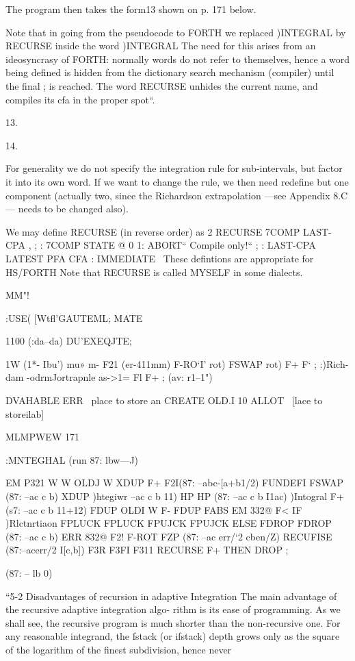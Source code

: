 {The program then takes the form13 shown on p. 171 below.

Note that in going from the pseudocode to FORTH we replaced
)INTEGRAL by RECURSE inside the word )INTEGRAL The
need for this arises from an ideosyncrasy of FORTH: normally
words do not refer to themselves, hence a word being deﬁned is
hidden from the dictionary search mechanism (compiler) until
the ﬁnal ; is reached. The word RECURSE unhides the current
name, and compiles its cfa in the proper spot“.

 

13.

14.

For generality we do not specify the integration rule for sub-intervals, but factor it into its own
word. If we want to change the rule, we then need redeﬁne but one component (actually two,
since the Richardson extrapolation —see Appendix 8.C— needs to be changed also).

We may deﬁne RECURSE (in reverse order) as
2 RECURSE 7COMP LAST-CPA , ;
: 7COMP STATE @ 0 1: ABORT“ Compile only!“ ;
: LAST-CPA LATEST PFA CFA : IMMEDIATE
\ These defintions are appropriate for HS/FORTH
Note that RECURSE is called MYSELF in some dialects.

 

MM"!

:USE( [Wtﬂ'GAUTEML;
MATE

1100 (:da--da) DU’EXEQJTE;

1W (1*- Ibu')
\taumpuoudm
mu» m- F21 (er-411mm)
F-RO‘I’ rot) FSWAP rot) F+ F‘ ;
:)Rich-dam \R-odrmJortrapnle
as->1= Fl F+ ; (av: r1--1")

DVAHABLE ERR \ place to store an
CREATE OLD.I 10 ALLOT
\ [lace to storeilab]

 

MLMPWEW 171

:MNTEGHAL (run 87: lbw—J)

EM P321
W W
OLDJ W
XDUP F+ F2I(87: --abc-[a+b1/2)
FUNDEFI FSWAP (87: --ac c b)
XDUP )htegiwr --ac c b 11)
HP HP (87: --ac c b I1ac)
)Intogral F+ (s7: --ac c b 11+12)
FDUP OLDI W F-
FDUP FABS EM 332@ F<
IF )Rlctnrtiaon
FPLUCK FPLUCK FPUJCK FPUJCK
ELSE FDROP FDROP (87: --ac c b)
ERR 832@ F2!
F-ROT FZP (87: --ac err/‘2 cben/Z)
RECUFISE (87:--acerr/2 I[c,b])
F3R F3FI F311 RECURSE F+
THEN DROP ;

(87: -- lb 0)

“5-2 Disadvantages of recursion in adaptive Integration
The main advantage of the recursive adaptive integration algo-
rithm is its ease of programming. As we shall see, the recursive
program is much shorter than the non-recursive one. For any
reasonable integrand, the fstack (or ifstack) depth grows only as
the square of the logarithm of the ﬁnest subdivision, hence never

}
